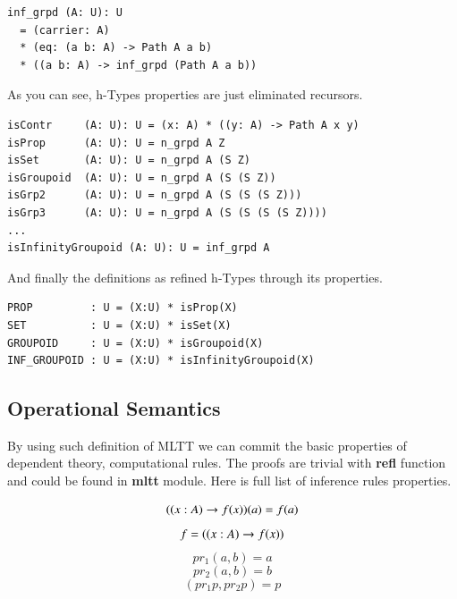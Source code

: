 \documentclass{article}
\begin{document}
\begin{lstlisting}
inf_grpd (A: U): U
  = (carrier: A)
  * (eq: (a b: A) -> Path A a b)
  * ((a b: A) -> inf_grpd (Path A a b))
\end{lstlisting}

As you can see, h-Types properties are just eliminated recursors.

\begin{lstlisting}[mathescape=true]
isContr     (A: U): U = (x: A) * ((y: A) -> Path A x y)
isProp      (A: U): U = n_grpd A Z
isSet       (A: U): U = n_grpd A (S Z)
isGroupoid  (A: U): U = n_grpd A (S (S Z))
isGrp2      (A: U): U = n_grpd A (S (S (S Z)))
isGrp3      (A: U): U = n_grpd A (S (S (S (S Z))))
...
isInfinityGroupoid (A: U): U = inf_grpd A
\end{lstlisting}

And finally the definitions as refined h-Types through its properties.

\begin{lstlisting}[mathescape=true]
PROP         : U = (X:U) * isProp(X)
SET          : U = (X:U) * isSet(X)
GROUPOID     : U = (X:U) * isGroupoid(X)
INF_GROUPOID : U = (X:U) * isInfinityGroupoid(X)
\end{lstlisting}

\subsection{Operational Semantics}

By using such definition of MLTT we can commit the basic properties
of dependent theory, computational rules. The proofs are trivial
with {\bf refl} function and could be found in {\bf mltt} module.
Here is full list of inference rules properties.

\begin{equation} (\\(x:A) \rightarrow f(x))(a) = f(a) \end{equation}
\begin{equation} f = (\\(x:A) \rightarrow f(x)) \end{equation}
\begin{equation} pr_1 (a,b) = a \end{equation}
\begin{equation} pr_2 (a,b) = b \end{equation}
\begin{equation} (pr_1 p,pr_2 p) = p \end{equation}
\end{document}
